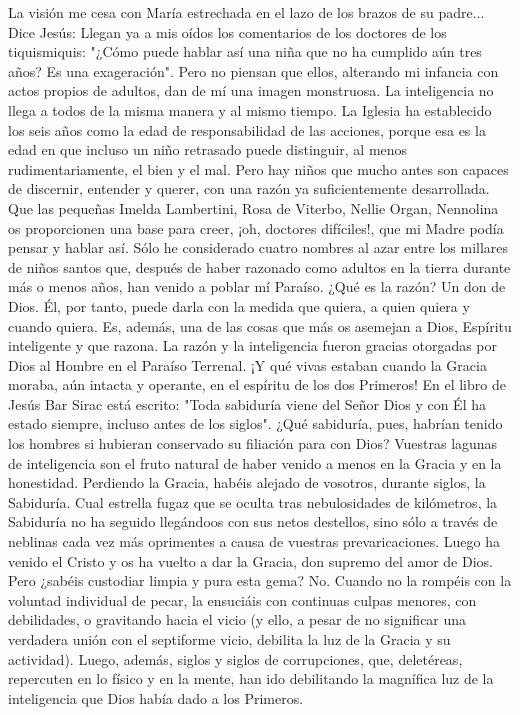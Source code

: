 \documentclass[12pt]{book} %
\begin{document}
La visión me cesa con María estrechada en el lazo de los brazos de su padre... 
Dice Jesús: 
Llegan ya a mis oídos los comentarios de los doctores de los tiquismiquis: "¿Cómo puede hablar así una niña que no ha 
cumplido aún tres años? Es una exageración". Pero no piensan que ellos, alterando mi infancia con actos propios de adultos, dan de mí una imagen monstruosa. 
La inteligencia no llega a todos de la misma manera y al mismo tiempo. La Iglesia ha establecido los seis años como la edad de responsabilidad de las acciones, porque esa es la edad en que incluso un niño retrasado puede distinguir, al menos rudimentariamente, el bien y el mal. Pero hay niños que mucho antes son capaces de discernir, entender y querer, con una razón ya suficientemente desarrollada. Que las pequeñas Imelda Lambertini, Rosa de Viterbo, Nellie Organ, Nennolina os proporcionen una base para creer, ¡oh, doctores difíciles!, que mi Madre podía pensar y hablar así. Sólo he considerado cuatro nombres al azar entre los millares de niños santos que, después de haber razonado como adultos en la tierra durante más o menos años, han venido a poblar mí Paraíso. 
¿Qué es la razón? Un don de Dios. Él, por tanto, puede darla con la medida que quiera, a quien quiera y cuando quiera. 
Es, además, una de las cosas que más os asemejan a Dios, Espíritu inteligente y que razona. La razón y la inteligencia fueron gracias otorgadas por Dios al Hombre en el Paraíso Terrenal. ¡Y qué vivas estaban cuando la Gracia moraba, aún intacta y operante, en el espíritu de los dos Primeros! 
En el libro de Jesús Bar Sirac está escrito: "Toda sabiduría viene del Señor Dios y con Él ha estado siempre, incluso antes 
de los siglos". ¿Qué sabiduría, pues, habrían tenido los hombres si hubieran conservado su filiación para con Dios? 
Vuestras lagunas de inteligencia son el fruto natural de haber venido a menos en la Gracia y en la honestidad. Perdiendo la Gracia, habéis alejado de vosotros, durante siglos, la Sabiduría. Cual estrella fugaz que se oculta tras nebulosidades de kilómetros, la Sabiduría no ha seguido llegándoos con sus netos destellos, sino sólo a través de neblinas cada vez más oprimentes a causa de vuestras prevaricaciones. 
Luego ha venido el Cristo y os ha vuelto a dar la Gracia, don supremo del amor de Dios. Pero ¿sabéis custodiar limpia y pura esta gema? No. Cuando no la rompéis con la voluntad individual de pecar, la ensuciáis con continuas culpas menores, con debilidades, o gravitando hacia el vicio (y ello, a pesar de no significar una verdadera unión con el septiforme vicio, debilita la luz de la Gracia y su actividad). Luego, además, siglos y siglos de corrupciones, que, deletéreas, repercuten en lo físico y en la mente, han ido debilitando la magnífica luz de la inteligencia que Dios había dado a los Primeros. 
\end{document}
